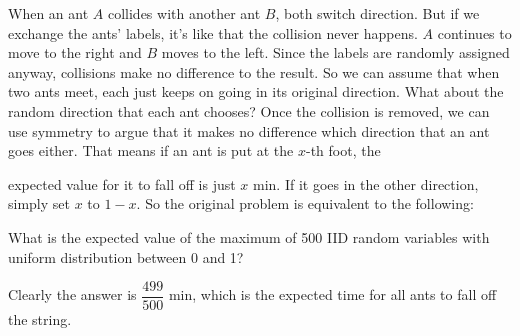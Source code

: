 \begin{solution}
When an ant $A$ collides with another ant $B$, both switch direction. But if we exchange
the ants' labels, it's like that the collision never happens. $A$ continues to move to the
right and $B$ moves to the left. Since the labels are randomly assigned anyway, collisions
make no difference to the result. So we can assume that when two ants meet, each just
keeps on going in its original direction. What about the random direction that each ant
chooses? Once the collision is removed, we can use symmetry to argue that it makes no
difference which direction that an ant goes either. That means if an ant is put at the
$x$-th foot, the


expected value for it to fall off is just $x$ min. If it goes in the other direction, simply set
$x$ to $1-x$. So the original problem is equivalent to the following:

What is the expected value of the maximum of 500 IID random variables with uniform
distribution between 0 and 1?

Clearly the answer is $\dfrac{499}{500}$ min, which is the expected time for all ants to fall
off the string.
\end{solution}
